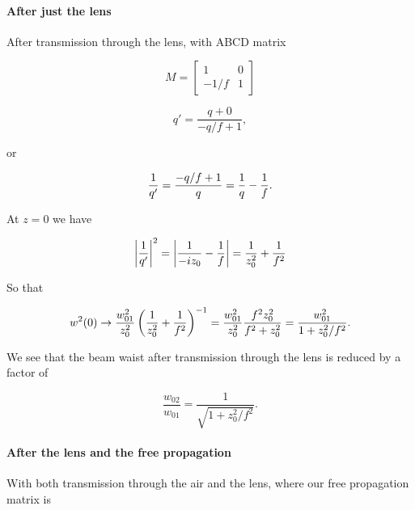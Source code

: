 {\paragraph{After just the lens}

After transmission through the lens, with ABCD matrix

\begin{dmath}\label{eqn:problemSet4Problem1:40}
M =
\begin{bmatrix}
1 & 0 \\
-1/f & 1
\end{bmatrix}
\end{dmath}

\begin{dmath}\label{eqn:problemSet4Problem1:60}
q' =
\frac{q + 0}{-q/f + 1},
\end{dmath}

or

\begin{dmath}\label{eqn:problemSet4Problem1:80}
\inv{q'}
=
\frac
{-q/f + 1}
{q}
=
\inv{q} -\inv{f}.
\end{dmath}

At $z = 0$ we have

\begin{dmath}\label{eqn:problemSet4Problem1:100}
\Abs{\inv{q'}}^2
= \Abs{ \inv{-i z_0} - \inv{f} }
= \inv{z_0^2} + \inv{f^2}
\end{dmath}

So that

\begin{dmath}\label{eqn:problemSet4Problem1:120}
w^2(0)
\rightarrow
\frac{w_{01}^2}{z_0^2}
\left( \inv{z_0^2} + \inv{f^2}  \right)^{-1}
=
\frac{w_{01}^2}{z_0^2}
\frac{ f^2 z_0^2}{
f^2 + z_0^2
}
=
\frac{w_{01}^2}{ 1 + z_0^2/f^2}.
\end{dmath}

We see that the beam waist after transmission through the lens is reduced by a factor of

\begin{dmath}\label{eqn:problemSet4Problem1:140}
\frac
{w_{02}}
{w_{01}}
=
\frac{1}{ \sqrt{1 + z_0^2/f^2} }.
\end{dmath}

\paragraph{After the lens and the free propagation}

With both transmission through the air and the lens, where our free propagation matrix is

}
